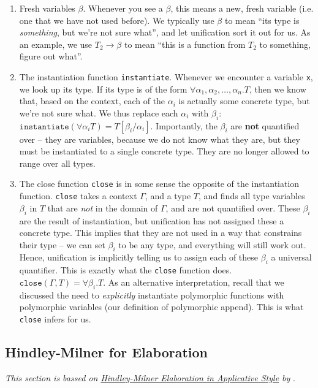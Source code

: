 {\begin{enumerate}
    \item Fresh variables $\beta$. Whenever you see a $\beta$, this means a new, fresh variable (i.e. one that we have not used before). We typically use $\beta$ to mean ``its type is \textit{something}, but we're not sure what'', and let unification sort it out for us. As an example, we use $T_2 \to \beta$ to mean ``this is a function from $T_2$ to something, figure out what''. 
    \item The instantiation function \texttt{instantiate}. Whenever we encounter a variable \texttt{x}, we look up its type. If its type is of the form $\forall \alpha_1, \alpha_2, \ldots, \alpha_n . T$, then we know that, based on the context, each of the $\alpha_i$ is actually some concrete type, but we're not sure what. We thus replace each $\alpha_i$ with $\beta_i$: $\texttt{instantiate}(\forall \alpha_i T) = T[\beta_i / \alpha_i]$. Importantly, the $\beta_i$ are \textbf{not} quantified over -- they are variables, because we do not know what they are, but they must be instantiated to a single concrete type. They are no longer allowed to range over all types.
    \item The close function \texttt{close} is in some sense the opposite of the instantiation function. \texttt{close} takes a context $\Gamma$, and a type $T$, and finds all type variables $\beta_i$ in $T$ that are \textit{not} in the domain of $\Gamma$, and are not quantified over. These $\beta_i$ are the result of instantiation, but unification has not assigned these a concrete type. This implies that they are not used in a way that constrains their type -- we can set $\beta_i$ to be any type, and everything will still work out. Hence, unification is implicitly telling us to assign each of these $\beta_i$ a universal quantifier. This is exactly what the \texttt{close} function does. $\texttt{close}(\Gamma, T) = \forall \beta_i . T$. As an alternative interpretation, recall that we discussed the need to \textit{explicitly} instantiate polymorphic functions with polymorphic variables (our definition of polymorphic append). This is what \texttt{close} infers for us.
\end{enumerate}


\subsection{Hindley-Milner for Elaboration}
\textit{This section is bassed on \href{http://gallium.inria.fr/~fpottier/publis/fpottier-elaboration.pdf}{Hindley-Milner Elaboration in Applicative Style} by} \citet{pottier-2014}.

}

